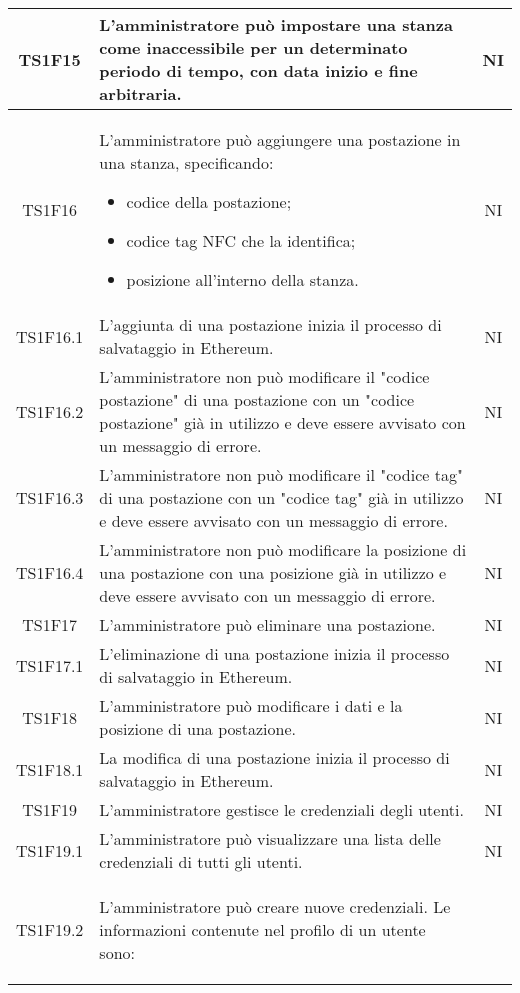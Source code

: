 \begin{center}
\begin{longtable}{|c|p{10cm}|c|}
			\hline
			TS1F15 & L'amministratore può impostare una stanza come inaccessibile per un determinato periodo di tempo, con data inizio e fine arbitraria. & NI \\			
			\hline
			TS1F16 & L'amministratore può aggiungere una postazione in una stanza, specificando:
			\begin{itemize}
				\item codice della postazione;
				\item codice tag NFC che la identifica;
				\item posizione all'interno della stanza.
			\end{itemize}
			& NI \\			
			\hline			
			TS1F16.1 & L'aggiunta di una postazione inizia il processo di salvataggio in Ethereum. & NI \\			
			\hline				
			TS1F16.2 & L'amministratore non può modificare il "codice postazione" di una postazione con un "codice postazione" già in utilizzo e deve essere avvisato con un messaggio di errore. & NI \\			
			\hline			
			TS1F16.3 & L'amministratore non può modificare il "codice tag" di una postazione con un "codice tag" già in utilizzo e deve essere avvisato con un messaggio di errore. & NI \\			
			\hline			
			TS1F16.4 & L'amministratore non può modificare la posizione di una postazione con una posizione già in utilizzo e deve essere avvisato con un messaggio di errore. & NI \\			
			\hline
			TS1F17 & L'amministratore può eliminare una postazione. & NI \\			
			\hline		
			TS1F17.1 & L'eliminazione di una postazione inizia il processo di salvataggio in Ethereum. & NI \\			
			\hline	
			TS1F18 & L'amministratore può modificare i dati e la posizione di una postazione. & NI \\			
			\hline	
			TS1F18.1 & La modifica di una postazione inizia il processo di salvataggio in Ethereum. & NI \\			
			\hline	
			TS1F19 & L'amministratore gestisce le credenziali degli utenti. & NI \\	
			\hline
			TS1F19.1 & L'amministratore può visualizzare una lista delle credenziali di tutti gli utenti. & NI \\	
			\hline
			TS1F19.2 & L'amministratore può creare nuove credenziali. Le informazioni contenute nel profilo di un utente sono:
			\begin{itemize}

\end{itemize}
\end{longtable}
\end{center}
